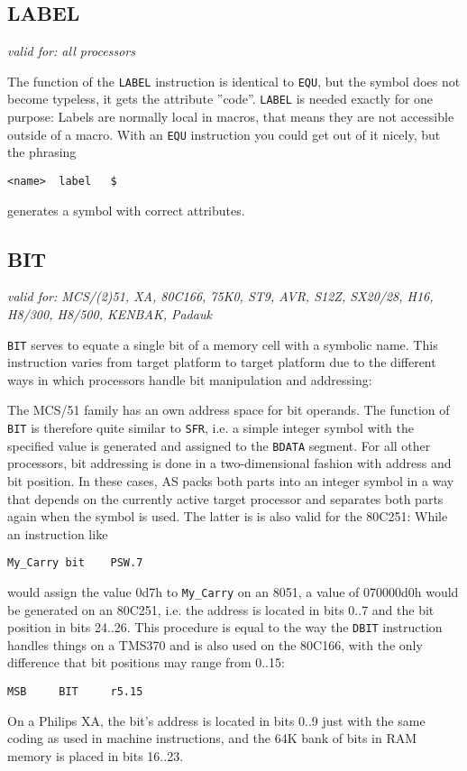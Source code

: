 \documentclass[12pt,twoside]{report}
\makeatletter
\newcommand{\tty}[1]{{\tt #1}}
\newcommand{\ttindex}[1]{\index{#1@{\tt #1}}}
\makeatother
\begin{document}
\subsection{LABEL}
\ttindex{LABEL}

{\em valid for: all processors}

The function of the \tty{LABEL} instruction is identical to \tty{EQU}, but
the symbol does not become typeless, it gets the attribute ''code''.
\tty{LABEL} is needed exactly for one purpose: Labels are normally local
in macros, that means they are not accessible outside of a macro.  With an
\tty{EQU} instruction you could get out of it nicely, but the phrasing
\begin{verbatim}
<name>  label   $
\end{verbatim}
generates a symbol with correct attributes.


\subsection{BIT}
\ttindex{BIT}

{\em valid for: MCS/(2)51, XA, 80C166, 75K0, ST9, AVR, S12Z, SX20/28, H16,
                H8/300, H8/500, KENBAK, Padauk}

\tty{BIT} serves to equate a single bit of a memory cell with a symbolic
name.  This instruction varies from target platform to target platform due
to the different ways in which processors handle bit manipulation and
addressing:

The MCS/51 family has an own address space for bit operands.  The function
of \tty{BIT} is therefore quite similar to \tty{SFR}, i.e. a simple integer
symbol with the specified value is generated and assigned to the
\tty{BDATA} segment.  For all other processors, bit addressing is done in
a two-dimensional fashion with address and bit position.  In these cases,
AS packs both parts into an integer symbol in a way that depends on the
currently active target processor and separates both parts again when the
symbol is used.  The latter is is also valid for the 80C251: While an
instruction like
\begin{verbatim}
My_Carry bit    PSW.7
\end{verbatim}
would assign the value 0d7h to \tty{My\_Carry} on an 8051, a value of
070000d0h would be generated on an 80C251, i.e. the address is located in
bits 0..7 and the bit position in bits 24..26.  This procedure is equal to
the way the \tty{DBIT} instruction handles things on a TMS370 and is also
used on the 80C166, with the only difference that bit positions may range
from 0..15:
\begin{verbatim}
MSB     BIT     r5.15
\end{verbatim}
On a Philips XA, the bit's address is located in bits 0..9 just with
the same coding as used in machine instructions, and the 64K bank of
bits in RAM memory is placed in bits 16..23.
\end{document}
